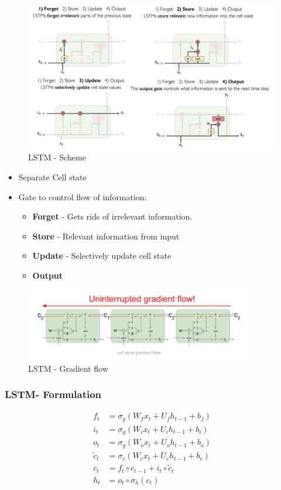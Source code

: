 \documentclass{article}
\begin{document}
\begin{figure}[H]\centering\includegraphics[width=14cm]{LSTM_SCHEME.jpeg}\caption{LSTM - Scheme}\end{figure}

\begin{itemize}
	\item Separate Cell state
	\item Gate to control flow of information:
	\begin{itemize}
		\item \textbf{Forget} - Gets rids of irrelevant information.
		\item \textbf{Store} - Relevant information from input
		\item \textbf{Update} - Selectively update cell state
		\item \textbf{Output}
	\end{itemize}
\end{itemize}


\begin{figure}[H]\centering\includegraphics[width=10cm]{LSTM_GRADIENT_FLOW.png}\caption{LSTM - Gradient flow}\end{figure}


\subsubsection{LSTM- Formulation}
\begin{align*}
f_t &= \sigma_g(W_{f} x_t + U_{f} h_{t-1} + b_f) \\
i_t &= \sigma_g(W_{i} x_t + U_{i} h_{t-1} + b_i) \\
o_t &= \sigma_g(W_{o} x_t + U_{o} h_{t-1} + b_o) \\
\tilde{c}_t &= \sigma_c(W_{c} x_t + U_{c} h_{t-1} + b_c) \\
c_t &= f_t \circ c_{t-1} + i_t \circ \tilde{c}_t \\
h_t &= o_t \circ \sigma_h(c_t)
\end{align*}
\end{document}
